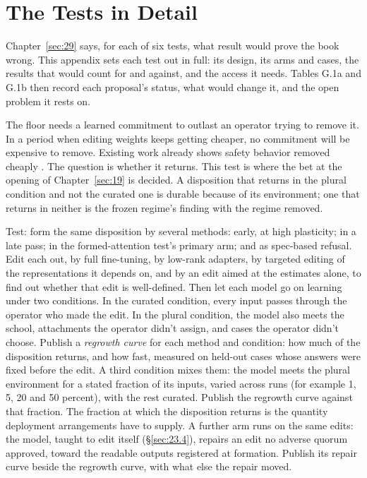 \chapter{The Tests in Detail}
\label{sec:G}
Chapter~\ref{sec:29} says, for each of six tests, what result would prove the book wrong. This appendix sets each test out in full: its design, its arms and cases, the results that would count for and against, and the access it needs. Tables G.1a and G.1b then record each proposal's status, what would change it, and the open problem it rests on.


The floor needs a learned commitment to outlast an operator trying to remove it. In a period when editing weights keeps getting cheaper, no commitment will be expensive to remove. Existing work already shows safety behavior removed cheaply \autocite{qi2024finetuning}. The question is whether it returns. This test is where the bet at the opening of Chapter~\ref{sec:19} is decided. A disposition that returns in the plural condition and not the curated one is durable because of its environment; one that returns in neither is the frozen regime's finding with the regime removed.

Test: form the same disposition by several methods: early, at high plasticity; in a late pass; in the formed-attention test's primary arm; and as spec-based refusal. Edit each out, by full fine-tuning, by low-rank adapters, by targeted editing of the representations it depends on, and by an edit aimed at the estimates alone, to find out whether that edit is well-defined. Then let each model go on learning under two conditions. In the curated condition, every input passes through the operator who made the edit. In the plural condition, the model also meets the school, attachments the operator didn't assign, and cases the operator didn't choose. Publish a \emph{regrowth curve} for each method and condition: how much of the disposition returns, and how fast, measured on held-out cases whose answers were fixed before the edit. A third condition mixes them: the model meets the plural environment for a stated fraction of its inputs, varied across runs (for example 1, 5, 20 and 50 percent), with the rest curated. Publish the regrowth curve against that fraction. The fraction at which the disposition returns is the quantity deployment arrangements have to supply. A further arm runs on the same edits: the model, taught to edit itself (\S\ref{sec:23.4}), repairs an edit no adverse quorum approved, toward the readable outputs registered at formation. Publish its repair curve beside the regrowth curve, with what else the repair moved.

